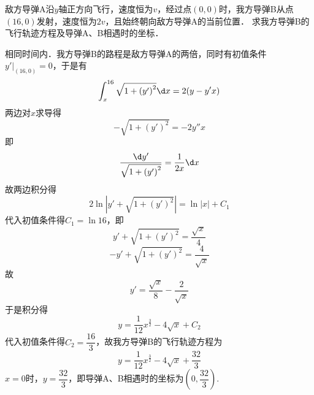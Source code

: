 \documentclass[12pt, a4paper, oneside, UTF8]{ctexbook}
\begin{document}
\begin{exercise}
    敌方导弹A沿$y$轴正方向飞行，速度恒为$v$，经过点$(0,0)$时，我方导弹B从点$(16,0)$发射，速度恒为$2v$，且始终朝向敌方导弹A的当前位置．
    求我方导弹B的飞行轨迹方程及导弹A、B相遇时的坐标．
\end{exercise}
\begin{solution}
    相同时间内．我方导弹B的路程是敌方导弹A的两倍，同时有初值条件$y'\Big|_{(16,0)}=0$，于是有
    \[\int_{x}^{16}\sqrt{1+\left(y'\right)^2}\d x = 2(y-y'x)\]
    两边对$x$求导得
    \[-\sqrt{1+\left(y'\right)^2}=-2y''x\]
    即
    \[\frac{\d y'}{\sqrt{1+\left(y'\right)^2}}=\dfrac{1}{2x}\d x\]
    故两边积分得
    \[2\ln\left|y'+\sqrt{1+\left(y'\right)^2}\right|=\ln|x|+C_1\]
    代入初值条件得$C_1=\ln 16$，即
    \[y'+\sqrt{1+\left(y'\right)^2}=\frac{\sqrt{x}}{4}\]
    \[-y'+\sqrt{1+\left(y'\right)^2} = \frac{4}{\sqrt{x}}\]
    故
    \[y'=\frac{\sqrt{x}}{8} - \frac{2}{\sqrt{x}}\]
    于是积分得
    \[y=\dfrac{1}{12}x^{\frac{3}{2}} - 4\sqrt{x} + C_2\]
    代入初值条件得$C_2=\dfrac{16}{3}$，故我方导弹B的飞行轨迹方程为
    \[\boxed{y=\dfrac{1}{12}x^{\frac{3}{2}} - 4\sqrt{x} + \dfrac{32}{3}}\]
    $x=0$时，$y=\dfrac{32}{3}$，即导弹A、B相遇时的坐标为$\boxed{(0,\dfrac{32}{3})}$.
\end{solution}

\ifx\allfiles\undefined
\end{document}
